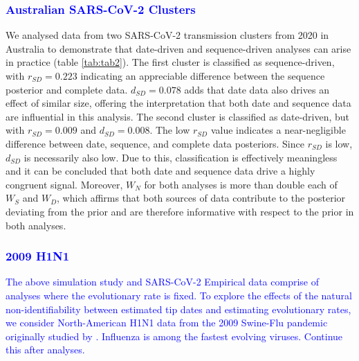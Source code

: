 \documentclass{article}
\begin{document}
\subsubsection*{\textcolor{blue}{Australian SARS-CoV-2 Clusters}}
We analysed data from two SARS-CoV-2 transmission clusters from 2020 in Australia to demonstrate that date-driven and sequence-driven analyses can arise in practice (table \ref{tab:tab2}). The first cluster is classified as sequence-driven, with $r_{SD} = 0.223$ indicating an appreciable difference between the sequence posterior and complete data. $d_{SD} = 0.078$ adds that date data also drives an effect of similar size, offering the interpretation that both date and sequence data are influential in this analysis. The second cluster is  classified as date-driven, but with $r_{SD} = 0.009$ and $d_{SD}=0.008$. The low $r_{SD}$ value indicates a near-negligible difference between date, sequence, and complete data posteriors. Since $r_{SD}$ is low, $d_{SD}$ is necessarily also low. Due to this, classification is effectively meaningless and it can be concluded that both date and sequence data drive a highly congruent signal. Moreover, $W_N$ for both analyses is more than double each of $W_S$ and $W_D$, which affirms that both sources of data contribute to the posterior deviating from the prior and are therefore informative with respect to the prior in both analyses.

\subsubsection*{\textcolor{blue}{2009 H1N1}}
\textcolor{blue}{The above simulation study and SARS-CoV-2 Empirical data comprise of analyses where the evolutionary rate is fixed. To explore the effects of the natural non-identifiability between estimated tip dates and estimating evolutionary rates, we consider North-American H1N1 data from the 2009 Swine-Flu pandemic originally studied by \citet{hedge_2013_real-time}. Influenza is among the fastest evolving viruses. Continue this after analyses.}
\end{document}

